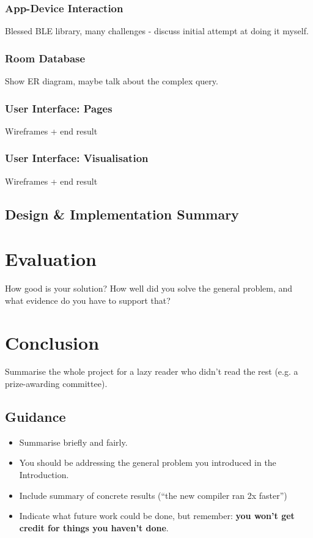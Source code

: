 \documentclass{l4proj}
\begin{document}
\subsection{App-Device Interaction}

Blessed BLE library, many challenges - discuss initial attempt at doing it myself.

\subsection{Room Database}

Show ER diagram, maybe talk about the complex query.

\subsection{User Interface: Pages}

Wireframes + end result

\subsection{User Interface: Visualisation}

Wireframes + end result

\section{Design \& Implementation Summary}



\chapter{Evaluation}
How good is your solution? How well did you solve the general problem, and what evidence do you have to support that?

\chapter{Conclusion}
Summarise the whole project for a lazy reader who didn't read the rest (e.g. a prize-awarding committee).
\section{Guidance}
\begin{itemize}
    \item
          Summarise briefly and fairly.
    \item
          You should be addressing the general problem you introduced in the
          Introduction.
    \item
          Include summary of concrete results (``the new compiler ran 2x
          faster'')
    \item
          Indicate what future work could be done, but remember: \textbf{you
              won't get credit for things you haven't done}.
\end{itemize}
\end{document}
